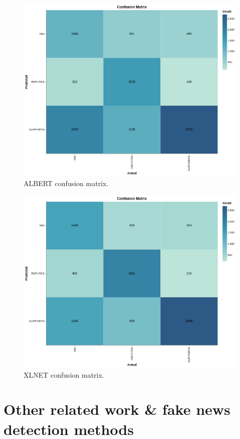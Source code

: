 \documentclass[conference]{IEEEtran}
\begin{document}
\begin{appendices}
\begin{figure}[htp]
    \centering
    \includegraphics[scale=0.5]{cm_albert.png}\hfill
    \caption{ALBERT confusion matrix.}
    \label{fig:cm_albert}
\end{figure}

\begin{figure}[htp]
    \centering
    \includegraphics[scale=0.5]{cm_xlnet.png}\hfill
    \caption{XLNET confusion matrix.}
    \label{fig:cm_xlnet}
\end{figure}

\newpage
\section{Other related work \& fake news detection methods}


\end{appendices}
\end{document}
